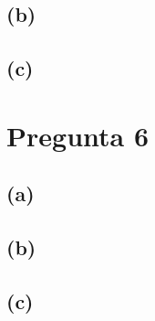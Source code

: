 \documentclass[12pt]{article}
\begin{document}
\subsection*{(b)}

\subsection*{(c)}

\newpage


\section*{Pregunta 6}

\subsection*{(a)}

\subsection*{(b)}

\subsection*{(c)}

\end{document}
